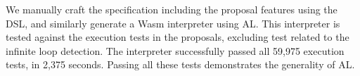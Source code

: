 We manually craft the specification including the proposal features using the
DSL, and similarly generate a Wasm interpreter using AL.
This interpreter is tested against the execution tests in the proposals,
excluding test related to the infinite loop detection.
The interpreter successfully passed all 59,975 execution tests, in 2,375
seconds.
Passing all these tests demonstrates the generality of AL.
